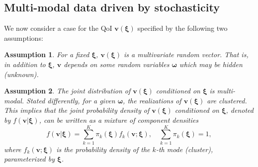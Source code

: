 \documentclass[preprint,10pt]{elsarticle}
\newtheorem{assumption}{Assumption}
\begin{document}
\subsection{Multi-modal data driven by stochasticity}
\label{}

We now consider a case for the QoI $\boldsymbol v(\boldsymbol\xi)$ specified by the following two assumptions:
%
\begin{assumption}
    For a fixed $\bm\xi$, $\boldsymbol v(\boldsymbol\xi)$ is a multivariate random vector. That is, in addition to $\bm\xi$, $\boldsymbol v$ depends on some random variables $\bm\omega$ which may be hidden (unknown).\\[-.2cm]
\end{assumption}

\begin{assumption}
    The joint distribution of $\boldsymbol v(\boldsymbol\xi)$ conditioned on $\bm\xi$ is multi-modal. Stated differently, for a given $\bm\omega$, the realizations of $\boldsymbol v(\boldsymbol\xi)$ are clustered. This implies that the joint probability density of $\boldsymbol v(\boldsymbol\xi)$ conditioned on $\bm\xi$, denoted by $f(\bm v | \bm \xi)$, can be written as a mixture of component densities
%
\begin{equation}
\label{eq:mixturedist}
 f(\bm v | \bm \xi) = \sum_{k=1}^K \pi_k(\bm \xi) f_k(\bm v; \bm \xi), \quad \sum_{k=1}^K \pi_k(\bm \xi)=1,
\end{equation}
%
where $f_k(\bm v; \bm \xi)$ is the probability density of the $k$-th mode (cluster), parameterized by $\bm \xi$. 
\end{assumption}
\end{document}
